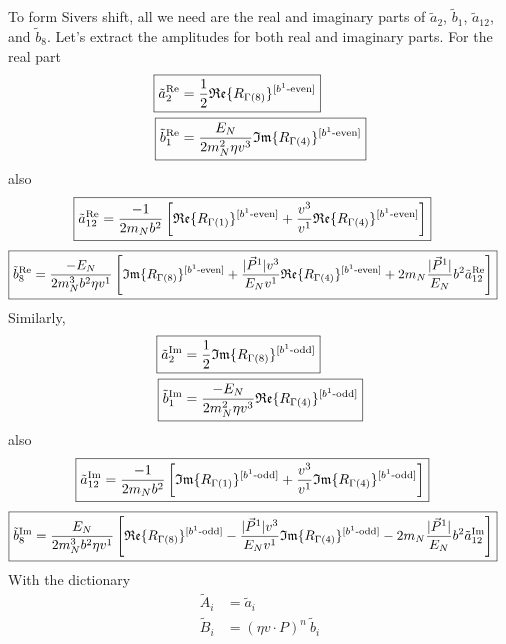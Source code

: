 \documentclass[]{article}
\numberwithin{equation}{section}
\newcommand{\tcdot}{{\cdot}}
\newcommand{\tAmp}{\widetilde{A}}
\newcommand{\tBmp}{\widetilde{B}}
\newcommand{\bvec}{b}
\newcommand{\mN}{m_N}
\begin{document}
To form Sivers shift, all we need are the real and imaginary parts of $\tilde a_2$, $\tilde b_1$, $\tilde a_{12}$, and $\tilde b_8$. Let's extract the amplitudes for both real and imaginary parts. For the real part
\begin{align}
    \Aboxed{\tilde a^{\text{Re}}_2 = & \frac{1}{2}\mathfrak{Re}\{ R_{\Gamma(8)}\}^{[b^{1}\text{-even}]} }\\
    \Aboxed{\tilde b^{\text{Re}}_1 = & \frac{E_{N}}{2\mN^2 \eta v^3} \mathfrak{Im}\{ R_{\Gamma(4)}\}^{[b^{1}\text{-even}]}}
\end{align}
also
\begin{align}
   \Aboxed{\tilde a^{\text{Re}}_{12}=&\frac{-1}{2\mN  \bvec^2}\left[\mathfrak{Re}\{ R_{\Gamma(1)}\}^{[b^{1}\text{-even}]}+\frac{v^3}{v^1}\mathfrak{Re}\{ R_{\Gamma(4)}\}^{[b^{1}\text{-even}]}\right]}
\end{align}
\begin{align}
    \Aboxed{\tilde b^{\text{Re}}_8=&\frac{-E_N}{ 2\mN^3 \bvec^2 \eta v^1 }\left[\mathfrak{Im}\{ R_{\Gamma(8)}\}^{[b^{1}\text{-even}]}+\frac{|\vec{P}^1|v^3}{E_N v^1}\mathfrak{Re}\{ R_{\Gamma(4)}\}^{[b^{1}\text{-even}]}+ 2\mN  \frac{|\vec{P}^1|}{E_N} \bvec^2  \tilde a^{\text{Re}}_{12}\right]}
\end{align}
Similarly,  
\begin{align}
    \Aboxed{\tilde a^{\text{Im}}_2 = & \frac{1}{2}\mathfrak{Im}\{ R_{\Gamma(8)}\}^{[b^{1}\text{-odd}]} }\\
    \Aboxed{\tilde b^{\text{Im}}_1 = & \frac{-E_{N}}{2\mN^2 \eta v^3} \mathfrak{Re}\{ R_{\Gamma(4)}\}^{[b^{1}\text{-odd}]}}
\end{align}
also
\begin{align}
   \Aboxed{\tilde a^{\text{Im}}_{12}=&\frac{-1}{2\mN  \bvec^2}\left[\mathfrak{Im}\{ R_{\Gamma(1)}\}^{[b^{1}\text{-odd}]}+\frac{v^3}{v^1}\mathfrak{Im}\{ R_{\Gamma(4)}\}^{[b^{1}\text{-odd}]}\right]}
\end{align}
\begin{align}
    \Aboxed{\tilde b^{\text{Im}}_8=&\frac{E_N}{ 2\mN^3 \bvec^2 \eta v^1 }\left[\mathfrak{Re}\{ R_{\Gamma(8)}\}^{[b^{1}\text{-odd}]}-\frac{|\vec{P}^1|v^3}{E_N v^1}\mathfrak{Im}\{ R_{\Gamma(4)}\}^{[b^{1}\text{-odd}]}- 2\mN  \frac{|\vec{P}^1|}{E_N} \bvec^2  \tilde a^{\text{Im}}_{12}\right]}
\end{align}
With the dictionary 
\begin{align}
	\tAmp_i & = \tilde a_i \\
	 \tBmp_i & = (\eta v \tcdot P)^n\ \tilde b_i
\end{align}
\end{document}
